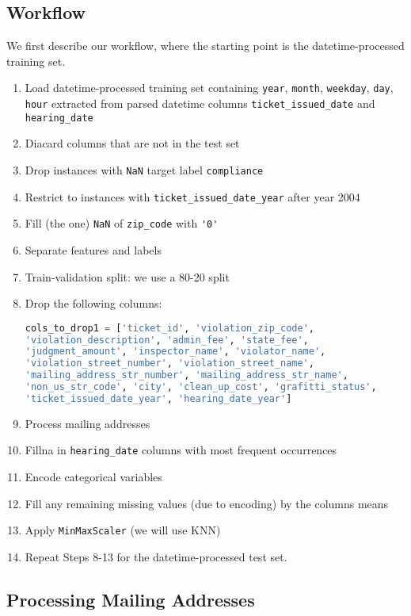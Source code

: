 \documentclass[12pt,letterpaper]{article}
\numberwithin{equation}{section}
\begin{document}
\subsection{Workflow}

We first describe our workflow, where the starting point is the datetime-processed training set.

\begin{enumerate}
\item Load datetime-processed training set containing \verb|year|, \verb|month|, \verb|weekday|, \verb|day|, \verb|hour| extracted from parsed datetime columns \verb|ticket_issued_date| and \verb|hearing_date|
\item Diacard columns that are not in the test set
\item Drop instances with \verb|NaN| target label \verb|compliance|
\item Restrict to instances with \verb|ticket_issued_date_year| after year 2004
\item Fill (the one) \verb|NaN| of \verb|zip_code| with \verb|'0'|
\item Separate features and labels
\item Train-validation split: we use a 80-20 split
\item Drop the following columns:
\begin{lstlisting}[language=Python, basicstyle=\footnotesize]
cols_to_drop1 = ['ticket_id', 'violation_zip_code', 
'violation_description', 'admin_fee', 'state_fee', 
'judgment_amount', 'inspector_name', 'violator_name', 
'violation_street_number', 'violation_street_name', 
'mailing_address_str_number', 'mailing_address_str_name', 
'non_us_str_code', 'city', 'clean_up_cost', 'grafitti_status', 
'ticket_issued_date_year', 'hearing_date_year']
\end{lstlisting}
\item Process mailing addresses
\item Fillna in \verb|hearing_date| columns with most frequent occurrences
\item Encode categorical variables
\item Fill any remaining missing values (due to encoding) by the columns means
\item Apply \verb|MinMaxScaler| (we will use KNN)
\item Repeat Steps 8-13 for the datetime-processed test set.
\end{enumerate}


\subsection{Processing Mailing Addresses}
\end{document}
